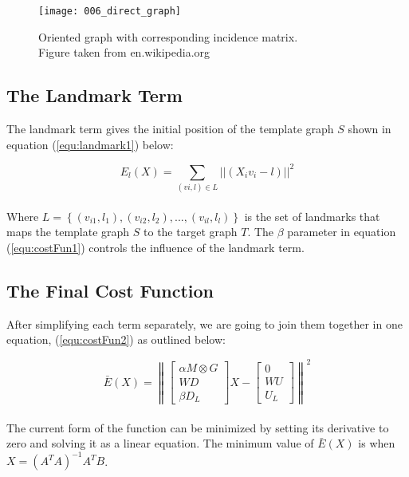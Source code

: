 \documentclass[../structure.tex]{subfiles}
\begin{document}
\begin{figure}[h!]
\centering
\texttt{[image: 006\_direct\_graph]}
\captionsetup{justification=centering}
\caption{Oriented graph with corresponding incidence matrix.\\ Figure taken from en.wikipedia.org}
\label{fig:directed_graph}
\end{figure}
\pagebreak
\subsection{The Landmark Term}
\hspace{2em}The landmark term gives the initial position of the template graph $S$ shown in equation (\ref{equ:landmark1}) below:

\begin{equation}
E_{l}(X) = \sum_{(vi,l) \in L}||(X_{i}v_{i} - l)||^2
\label{equ:landmark1}
\end{equation}\\

Where $L = \left\{(v_{i1},l_{1}),(v_{i2},l_{2}),...,(v_{il},l_{l})\right\}$ is the set of landmarks that maps the template graph $S$ to the target graph $T$. The $\beta$ parameter in equation (\ref{equ:costFun1}) controls the influence of the landmark term.

\subsection{The Final Cost Function}
After simplifying each term separately, we are going to join them together in one equation, (\ref{equ:costFun2}) as outlined below:

\begin{equation}
\bar{E}(X) = \left\|
\begin{bmatrix}
\alpha M \otimes G \\ WD \\ \beta D_{L}
\end{bmatrix}
X -
\begin{bmatrix}
0 \\ WU \\ U_{L}
\end{bmatrix}
\right\| ^2
\label{equ:costFun2}
\end{equation}\\

The current form of the function can be minimized by setting its derivative to zero and solving it as a linear equation. The minimum value of $\bar{E}(X)$ is when $X = (A^T A)^{-1} A^T B$.
\end{document}

